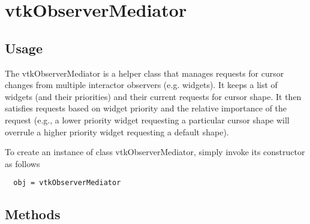 \section{vtkObserverMediator}

\subsection{Usage}

 The vtkObserverMediator is a helper class that manages requests for
 cursor changes from multiple interactor observers (e.g. widgets). It keeps
 a list of widgets (and their priorities) and their current requests for
 cursor shape. It then satisfies requests based on widget priority and the
 relative importance of the request (e.g., a lower priority widget
 requesting a particular cursor shape will overrule a higher priority
 widget requesting a default shape).

To create an instance of class vtkObserverMediator, simply
invoke its constructor as follows
\begin{verbatim}
  obj = vtkObserverMediator
\end{verbatim}
\subsection{Methods}

